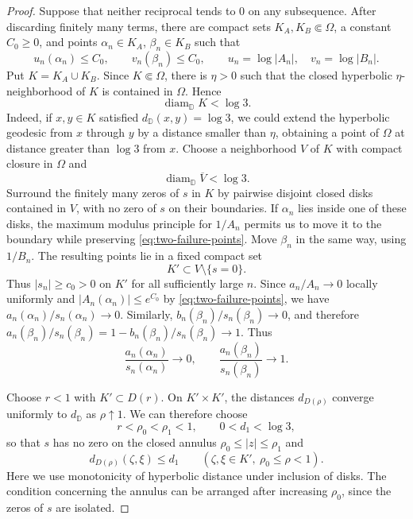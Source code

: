 \documentclass[12pt,letterpaper,reqno]{amsart}
\theoremstyle{definition}
\numberwithin{equation}{section}
\newcommand{\D}{\mathbb D}
\begin{document}
	\begin{proof}
		Suppose that neither reciprocal tends to $0$ on any subsequence.
		After discarding finitely many terms, there are compact sets
		$K_A,K_B\Subset\Omega$, a constant $C_0\ge0$, and points
		$\alpha_n\in K_A$, $\beta_n\in K_B$ such that
		\begin{equation}\label{eq:two-failure-points}
			u_n(\alpha_n)\le C_0,\qquad v_n(\beta_n)\le C_0,
			\qquad u_n=\log|A_n|,\quad v_n=\log|B_n|.
		\end{equation}
		Put $K=K_A\cup K_B$. Since $K\Subset\Omega$, there is $\eta>0$
		such that the closed hyperbolic $\eta$-neighborhood of $K$ is contained
		in $\Omega$. Hence
		\[
		\operatorname{diam}_{\D}K<\log3.
		\]
		Indeed, if $x,y\in K$ satisfied $d_{\D}(x,y)=\log3$, we could extend
		the hyperbolic geodesic from $x$ through $y$ by a distance smaller than
		$\eta$, obtaining a point of $\Omega$ at distance greater than $\log3$
		from $x$. Choose a neighborhood $V$ of $K$ with compact closure in
		$\Omega$ and
		\[
		\operatorname{diam}_{\D}\overline V<\log3.
		\]
		Surround the finitely many zeros of $s$ in $K$ by pairwise disjoint
		closed disks contained in $V$, with no zero of $s$ on their
		boundaries. If $\alpha_n$ lies inside one of these disks, the maximum
		modulus principle for $1/A_n$ permits us to move it to the boundary
		while preserving \eqref{eq:two-failure-points}. Move $\beta_n$ in
		the same way, using $1/B_n$. The resulting points lie in a fixed
		compact set
		\[
		K'\subset V\setminus\{s=0\}.
		\]
		Thus $|s_n|\ge c_0>0$ on $K'$ for all sufficiently large $n$.
		Since $a_n/A_n\to0$ locally uniformly and
		$|A_n(\alpha_n)|\le e^{C_0}$ by \eqref{eq:two-failure-points},
		we have $a_n(\alpha_n)/s_n(\alpha_n)\to0$. Similarly,
		$b_n(\beta_n)/s_n(\beta_n)\to0$, and therefore
		$a_n(\beta_n)/s_n(\beta_n)=1-b_n(\beta_n)/s_n(\beta_n)\to1$.
		Thus
		\begin{equation}\label{eq:endpoint-change}
			\frac{a_n(\alpha_n)}{s_n(\alpha_n)}\longrightarrow0,
			\qquad
			\frac{a_n(\beta_n)}{s_n(\beta_n)}\longrightarrow1.
		\end{equation}
		
		Choose $r<1$ with $K'\subset D(r)$. On $K'\times K'$, the distances
		$d_{D(\rho)}$ converge uniformly to $d_{\D}$ as $\rho\uparrow1$.
		We can therefore choose
		\[
		r<\rho_0<\rho_1<1,\qquad 0<d_1<\log3,
		\]
		so that $s$ has no zero on the closed annulus
		$\rho_0\le|z|\le\rho_1$ and
		\begin{equation}\label{eq:two-endpoint-distances}
			d_{D(\rho)}(\zeta,\xi)\le d_1
			\qquad(\zeta,\xi\in K',\ \rho_0\le\rho<1).
		\end{equation}
		Here we use monotonicity of hyperbolic distance under inclusion of
		disks. The condition concerning the annulus can be arranged after
		increasing $\rho_0$, since the zeros of $s$ are isolated.
		

\end{proof}
\end{document}
